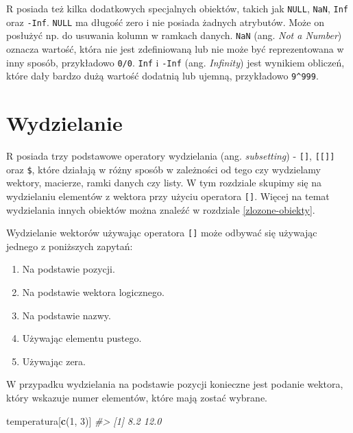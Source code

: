 \documentclass[paper=6in:9in,pagesize=pdftex,headinclude=on,footinclude=on,10pt]{scrbook}
\newenvironment{Shaded}{\begin{snugshade}}{\end{snugshade}}
\newcommand{\CommentTok}[1]{\textcolor[rgb]{0.56,0.35,0.01}{\textit{#1}}}
\newcommand{\DecValTok}[1]{\textcolor[rgb]{0.00,0.00,0.81}{#1}}
\newcommand{\KeywordTok}[1]{\textcolor[rgb]{0.13,0.29,0.53}{\textbf{#1}}}
\newcommand{\NormalTok}[1]{#1}
\providecommand{\tightlist}{%
  \setlength{\itemsep}{0pt}\setlength{\parskip}{0pt}}
\let\BeginKnitrBlock\begin \let\EndKnitrBlock\end
\begin{document}
\BeginKnitrBlock{rmdinfo}
R posiada też kilka dodatkowych specjalnych obiektów, takich jak \texttt{NULL}, \texttt{NaN}, \texttt{Inf} oraz \texttt{-Inf}.
\texttt{NULL} ma długość zero i nie posiada żadnych atrybutów.
Może on posłużyć np. do usuwania kolumn w ramkach danych.
\texttt{NaN} (ang. \emph{Not a Number}) oznacza wartość, która nie jest zdefiniowaną lub nie może być reprezentowana w inny sposób, przykładowo \texttt{0/0}.
\texttt{Inf} i \texttt{-Inf} (ang. \emph{Infinity}) jest wynikiem obliczeń, które dały bardzo dużą wartość dodatnią lub ujemną, przykładowo \texttt{9\^{}999}.
\EndKnitrBlock{rmdinfo}

\hypertarget{wydzielanie}{%
\section{Wydzielanie}\label{wydzielanie}}

R posiada trzy podstawowe operatory wydzielania (ang. \emph{subsetting}) - \texttt{{[}{]}}, \texttt{{[}{[}{]}{]}} oraz \texttt{\$}, które działają w różny sposób w zależności od tego czy wydzielamy wektory, macierze, ramki danych czy listy.
W tym rozdziale skupimy się na wydzielaniu elementów z wektora przy użyciu operatora \texttt{{[}{]}}.
Więcej na temat wydzielania innych obiektów można znaleźć w rozdziale \ref{zlozone-obiekty}.

Wydzielanie wektorów używając operatora \texttt{{[}{]}} może odbywać się używając jednego z poniższych zapytań:

\begin{enumerate}
\def\labelenumi{\arabic{enumi}.}
\tightlist
\item
  Na podstawie pozycji.
\item
  Na podstawie wektora logicznego.
\item
  Na podstawie nazwy.
\item
  Używając elementu pustego.
\item
  Używając zera.
\end{enumerate}

W przypadku wydzielania na podstawie pozycji konieczne jest podanie wektora, który wskazuje numer elementów, które mają zostać wybrane.

\begin{Shaded}
\begin{Highlighting}[]
\NormalTok{temperatura[}\KeywordTok{c}\NormalTok{(}\DecValTok{1}\NormalTok{, }\DecValTok{3}\NormalTok{)]}
\CommentTok{#> [1]  8.2 12.0}
\end{Highlighting}
\end{Shaded}
\end{document}
